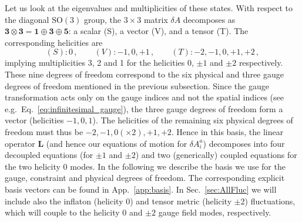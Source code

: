 Let us look at the eigenvalues and multiplicities of these states. With respect to the diagonal $\mathrm{SO}(3)$ group, the $3 \times 3$ matrix {$\delta A$} decomposes as $\mathbf{3} \otimes \mathbf{3} = \mathbf{1} \oplus \mathbf{3} \oplus \mathbf{5}$: a scalar (S), a vector (V), and a tensor (T). The corresponding helicities are
\begin{equation}
 (S) : 0 \,, \qquad (V) : -1, 0, + 1 \,, \qquad (T) : -2, -1, 0, +1, + 2 \,,
\end{equation}
implying multiplicities 3, 2 and 1 for the helicities $0$, $\pm 1$ and $\pm 2$ respectively. These nine degrees of freedom correspond to the six physical and three gauge degrees of freedom mentioned in the previous subsection. Since the gauge transformation acts only on the gauge indices and not the spatial indices (see e.g.\ Eq.~\eqref{eq:infinitesimal_gauge}), the three gauge degrees of freedom form a vector (helicities $-1,0,1$). The helicities of the remaining six physical degrees of freedom must thus be $-2, -1 , 0 (\times 2), +1, +2$. Hence in this basis, the linear operator $\mathbf L$ (and hence our equations of motion for $\delta A^a_i$) decomposes into four decoupled equations (for $\pm 1$ and $\pm 2$) and two (generically) coupled equations for the two helicity 0 modes. In the following we describe the basis we use for the gauge, constraint and physical degrees of freedom. The corresponding explicit basis vectors can be found in App.~\ref{app:basis}.  In Sec.~\ref{sec:AllFluc} we will include also the inflaton (helicity 0) and tensor metric (helicity $\pm2$) fluctuations, which will couple to the helicity 0 and $\pm2$ gauge field modes, respectively. 


